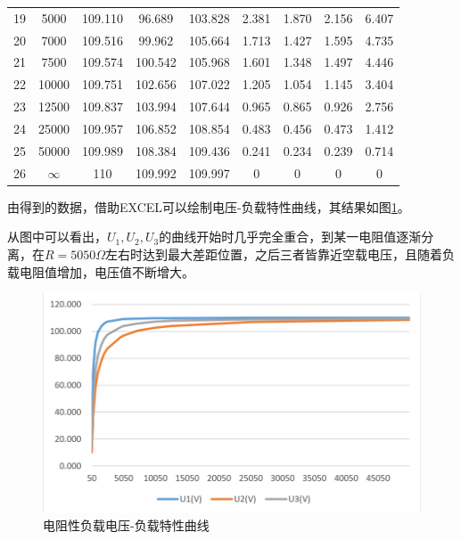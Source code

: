 \documentclass[12pt]{article}%
\begin{document}
\begin{table}[htbp]
\begin{tabular}{ccccccccc}
    19 & 5000 & 109.110  & 96.689  & 103.828  & 2.381  & 1.870  & 2.156  & 6.407  \\
    20 & 7000 & 109.516  & 99.962  & 105.664  & 1.713  & 1.427  & 1.595  & 4.735  \\
    21 & 7500 & 109.574  & 100.542  & 105.968  & 1.601  & 1.348  & 1.497  & 4.446  \\
    22 & 10000 & 109.751  & 102.656  & 107.022  & 1.205  & 1.054  & 1.145  & 3.404  \\
    23 & 12500 & 109.837  & 103.994  & 107.644  & 0.965  & 0.865  & 0.926  & 2.756  \\
    24 & 25000 & 109.957  & 106.852  & 108.854  & 0.483  & 0.456  & 0.473  & 1.412  \\
    25 & 50000 & 109.989  & 108.384  & 109.436  & 0.241  & 0.234  & 0.239  & 0.714  \\
    26 & $\infty$ & 110 & 109.992 & 109.997 & 0  & 0  & 0  & 0 \\
        \hline
    \end{tabular}%
  \label{tab:addlabela}%
\end{table}%
由得到的数据，借助EXCEL可以绘制电压-负载特性曲线，其结果如图\ref{fig:b11}。\par
从图中可以看出，$U_1,U_2,U_3$的曲线开始时几乎完全重合，到某一电阻值逐渐分离，在$R=5050\Omega$左右时达到最大差距位置，之后三者皆靠近空载电压，且随着负载电阻值增加，电压值不断增大。
\begin{figure}[htbp]
\centering\includegraphics[width=0.8\linewidth]{TIM20180531233136.png}
\caption{\heiti{}电阻性负载电压-负载特性曲线}\label{fig:b11}
\end{figure}
\end{document}
